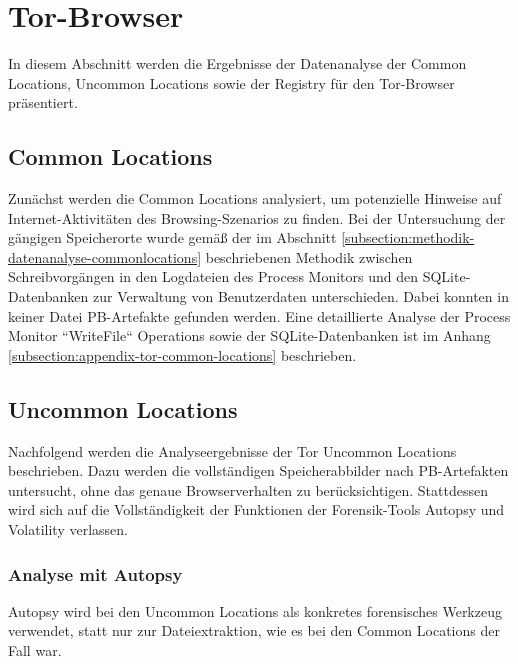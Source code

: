 

\newpage




\section{Tor-Browser}\label{section:ergebnisse-tor}

In diesem Abschnitt werden die Ergebnisse der Datenanalyse der Common Locations, Uncommon Locations sowie der Registry für den Tor-Browser präsentiert.

\subsection*{Common Locations}
Zunächst werden die Common Locations analysiert, um potenzielle Hinweise auf Internet-Aktivitäten des Browsing-Szenarios zu finden. Bei der Untersuchung der gängigen Speicherorte wurde gemäß der im Abschnitt \ref{subsection:methodik-datenanalyse-commonlocations} beschriebenen Methodik zwischen Schreibvorgängen in den Logdateien des Process Monitors und den SQLite-Datenbanken zur Verwaltung von Benutzerdaten unterschieden. Dabei konnten in keiner Datei PB-Artefakte gefunden werden. Eine detaillierte Analyse der Process Monitor ``WriteFile`` Operations sowie der SQLite-Datenbanken ist im Anhang \ref{subsection:appendix-tor-common-locations} beschrieben.

\subsection*{Uncommon Locations}
Nachfolgend werden die Analyseergebnisse der Tor Uncommon Locations beschrieben.
Dazu werden die vollständigen Speicherabbilder nach PB-Artefakten untersucht, ohne das genaue Browserverhalten zu berücksichtigen. Stattdessen wird sich auf die Vollständigkeit der Funktionen der Forensik-Tools Autopsy und Volatility verlassen.

\subsubsection*{Analyse mit Autopsy}
Autopsy wird bei den Uncommon Locations als konkretes forensisches Werkzeug verwendet, statt nur zur Dateiextraktion, wie es bei den Common Locations der Fall war.

